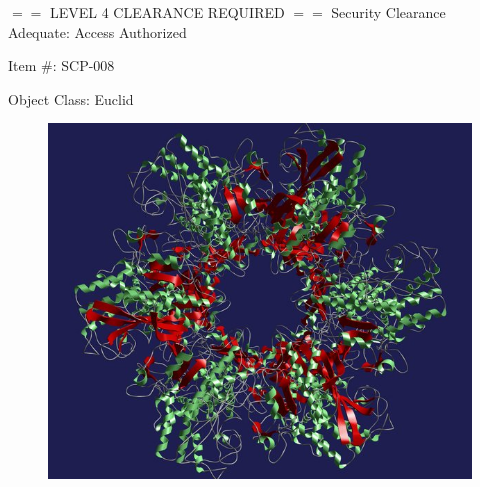 \begin{center}
$==$ LEVEL 4 CLEARANCE REQUIRED $==$\linebreak
Security Clearance Adequate: Access Authorized
\end{center}

Item \#: SCP-008

Object Class: Euclid

\begin{figure}
\includegraphics[scale=0.33]{scp/008.jpg}
\end{figure}

